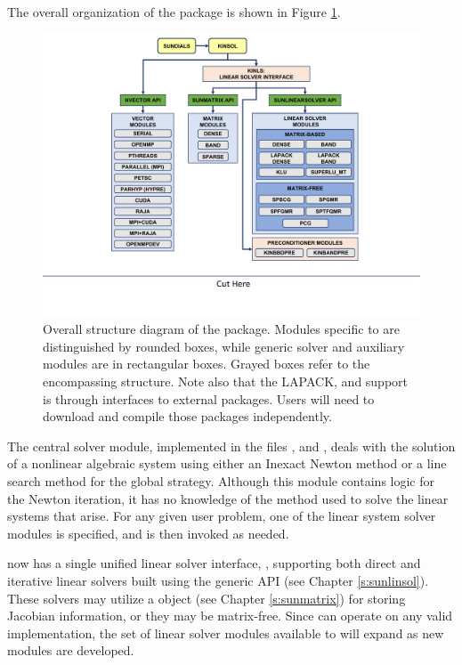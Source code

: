 The overall organization of the {\kinsol} package is shown in Figure
\ref{f:kinorg}.
\begin{figure}[htb]
{\centerline{\includegraphics[width=\textwidth]{kinorg}}}
\caption [Overall structure diagram of the KINSOL package]
{Overall structure diagram of the {\kinsol} package.
  Modules specific to {\kinsol} are distinguished by rounded boxes, while
  generic solver and auxiliary modules are in rectangular boxes.
  Grayed boxes refer to the encompassing {\sundials} structure.
  Note also that the LAPACK, {\klu} and {\superlumt} support is
  through interfaces to external packages. 
  Users will need to download and compile those packages independently.}
\label{f:kinorg}
\end{figure}
The central solver module, implemented in the files
,  and , deals with the solution
of a nonlinear algebraic system using either an Inexact Newton method or a
line search method for the global strategy. Although this module contains logic
for the Newton iteration, it has no knowledge of the method used to solve the
linear systems that arise. For any given user problem, one of the linear system
solver modules is specified, and is then invoked as needed.

{\kinsol} now has a single unified linear solver interface, {\kinls},
supporting both direct and iterative linear solvers built using the
generic {\sunlinsol} API (see Chapter \ref{s:sunlinsol}).  These
solvers may utilize a {\sunmatrix} object (see Chapter
\ref{s:sunmatrix}) for storing Jacobian information, or they may be
matrix-free. Since {\kinsol} can operate on any valid {\sunlinsol}
implementation, the set of linear solver modules available to
{\kinsol} will expand as new {\sunlinsol} modules are developed.

